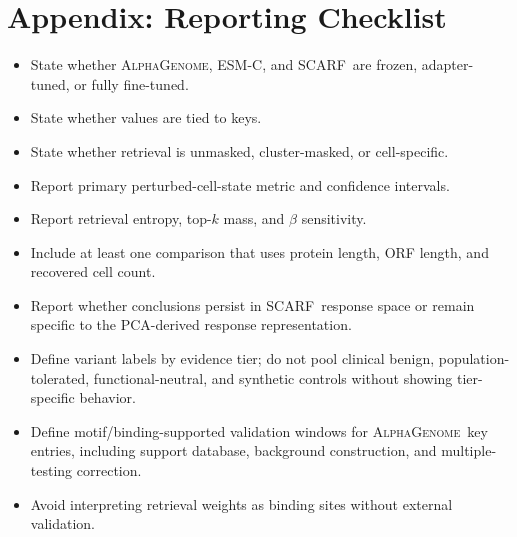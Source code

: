 \documentclass[11pt]{article}
\newcommand{\ag}{\textsc{AlphaGenome}}
\newcommand{\scarf}{\textsc{SCARF}}
\newcommand{\esm}{\textsc{ESM-C}}
\begin{document}
\section{Appendix: Reporting Checklist}

\begin{itemize}
    \item State whether \ag, \esm, and \scarf\ are frozen, adapter-tuned, or fully fine-tuned.
    \item State whether values are tied to keys.
    \item State whether retrieval is unmasked, cluster-masked, or cell-specific.
    \item Report primary perturbed-cell-state metric and confidence intervals.
    \item Report retrieval entropy, top-\(k\) mass, and \(\beta\) sensitivity.
    \item Include at least one comparison that uses protein length, ORF length, and recovered cell count.
    \item Report whether conclusions persist in \scarf\ response space or remain specific to the PCA-derived response representation.
    \item Define variant labels by evidence tier; do not pool clinical benign, population-tolerated, functional-neutral, and synthetic controls without showing tier-specific behavior.
    \item Define motif/binding-supported validation windows for \ag\ key entries, including support database, background construction, and multiple-testing correction.
    \item Avoid interpreting retrieval weights as binding sites without external validation.
\end{itemize}



\end{document}
